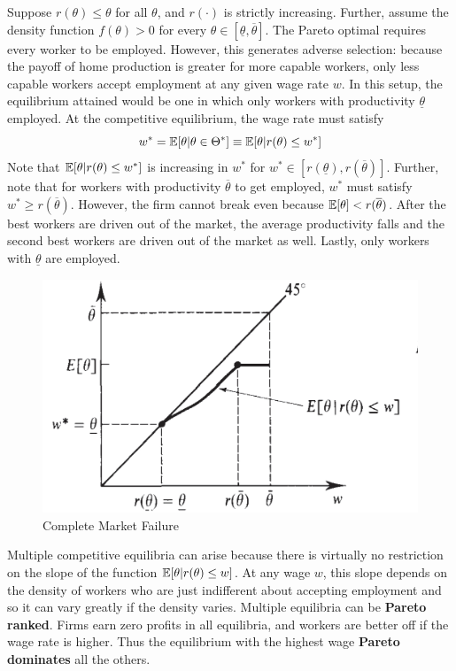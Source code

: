 \documentclass{report}
\begin{document}
		\begin{example}
			Suppose $r(\theta) \leq \theta$ for all $\theta$, and $r(\cdot)$ is strictly increasing. Further, assume the density function $f(\theta) > 0$ for every $\theta \in [\underline{\theta}, \overline{\theta}]$. The Pareto optimal requires every worker to be employed. However, this generates adverse selection: because the payoff of home production is greater for more capable workers, only less capable workers  accept employment at any given wage rate $w$. In this setup, the equilibrium attained would be one in which only workers with productivity $\underline{\theta}$ employed. At the competitive equilibrium, the wage rate must satisfy
			\begin{equation}
				w^* = \mathbb{E}[{\theta|\theta \in \Theta^*}] \equiv \mathbb{E}[{\theta|r(\theta) \leq w^*}]
			\end{equation}
			Note that $\mathbb{E}[{\theta|r(\theta) \leq w^*}]$ is increasing in $w^*$ for $w^* \in [r(\underline{\theta}), r(\overline{\theta})]$.
			Further, note that for workers with productivity $\overline{\theta}$ to get employed, $w^*$ must satisfy $w^* \geq r(\overline{\theta})$. However, the firm cannot break even because $\mathbb{E}[{\theta}] < r(\overline{\theta})$. After the best workers are driven out of the market, the average productivity falls and the second best workers are driven out of the market as well. Lastly, only workers with $\underline{\theta}$ are employed.
		\end{example}
		
		\begin{figure}[h]
			\centering
			\includegraphics[width=0.5\linewidth]{figures/complete_market_failure}
			\caption{Complete Market Failure}
		\end{figure}
		
		\begin{remark}
			Multiple competitive equilibria can arise because there is virtually no restriction on the slope of the function $\mathbb{E}[{\theta|r(\theta) \leq w}]$. At any wage $w$, this slope depends on the density of workers who are just indifferent about accepting employment and so it can vary greatly if the density varies. Multiple equilibria can be \textbf{Pareto ranked}. Firms earn zero profits in all equilibria, and workers are better off if the wage rate is higher. Thus the equilibrium with the highest wage \textbf{Pareto dominates} all the others.
		\end{remark}
		
\end{document}
